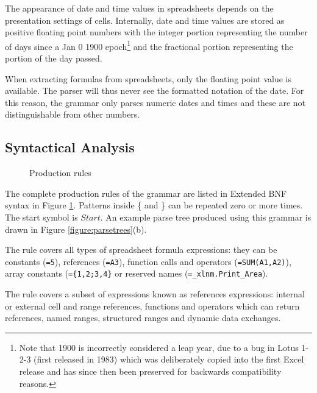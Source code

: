 The appearance of date and time values in spreadsheets depends on the presentation settings of cells. Internally, date and time values are stored as positive floating point numbers with the integer portion representing the number of days since a Jan 0 1900 epoch\footnote{Note that 1900 is incorrectly considered a leap year, due to a bug in Lotus 1-2-3 (first released in 1983) which was deliberately copied into the first Excel release and has since then been preserved for backwards compatibility reasons.} and the fractional portion representing the portion of the day passed.

When extracting formulas from spreadsheets, only the floating point value is available.
The parser will thus never see the formatted notation of the date.
For this reason, the grammar only parses numeric dates and times and these are not distinguishable from other numbers.

\subsection{Syntactical Analysis}

\begin{figure}
\small
\begin{multicols*}{2}

\end{multicols*}
\caption{Production rules}
\label{figure:productions}
\end{figure}

The complete production rules of the grammar are listed in Extended BNF syntax in Figure \ref{figure:productions}.
Patterns inside \{ and \} can be repeated zero or more times.
The start symbol is $Start$. An example parse tree produced using this grammar is drawn in Figure \ref{figure:parsetrees}(b).

The  rule covers all types of spreadsheet formula expressions: they can be constants (\texttt{=5}), references (\texttt{=A3}), function calls and operators (\texttt{=SUM(A1,A2)}), array constants (\texttt{=\{1,2;3,4\}} or reserved names (\texttt{=_xlnm.Print_Area}).

The  rule covers a subset of expressions known as references expressions: internal or external cell and range references, functions and operators which can return references, named ranges, structured ranges and dynamic data exchanges.


%	
%
%	

